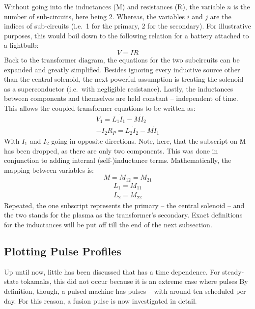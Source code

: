 Without going into the inductances (M) and resistances (R), the variable $n$ is the number of sub-circuits, here being 2. Whereas, the variables $i$ and $j$ are the indices of sub-circuits (i.e.\ 1 for the primary, 2 for the secondary). For illustrative purposes, this would boil down to the following relation for a battery attached to a lightbulb:
\begin{equation}
	V = I R
\end{equation}
Back to the transformer diagram, the equations for the two subcircuits can be expanded and greatly simplified. Besides ignoring every inductive source other than the central solenoid, the next powerful assumption is treating the solenoid as a superconductor (i.e.\ with negligible resistance). Lastly, the inductances between components and themselves are held constant -- independent of time. This allows the coupled transformer equations to be written as:
\begin{align}
	\label{eq:circ1}
	V_1 = L_1 \dot I_1 - M \dot I_2 \\
	\label{eq:circ2}
	-I_2 R_P = L_2 \dot I_2 - M \dot I_1
\end{align}
With $I_1$ and $I_2$ going in opposite directions. Note, here, that the subscript on M has been dropped, as there are only two components. This was done in conjunction to adding internal (self-)inductance terms. Mathematically, the mapping between variables is:
\begin{equation}
	M = M_{12} = M_{21}
\end{equation}
\begin{gather}
	L_1 = M_{11} \\
	L_2 = M_{22}
\end{gather}
Repeated, the one subscript represents the primary -- the central solenoid -- and the two stands for the plasma as the transformer's secondary. Exact definitions for the inductances will be put off till the end of the next subsection.

\subsection{Plotting Pulse Profiles}

Up until now, little has been discussed that has a time dependence. For steady-state tokamaks, this did not occur because it is an extreme case where pulses  By definition, though, a pulsed machine has pulses -- with around ten scheduled per day.\cite{ac_pulses} For this reason, a fusion pulse is now investigated in detail.

